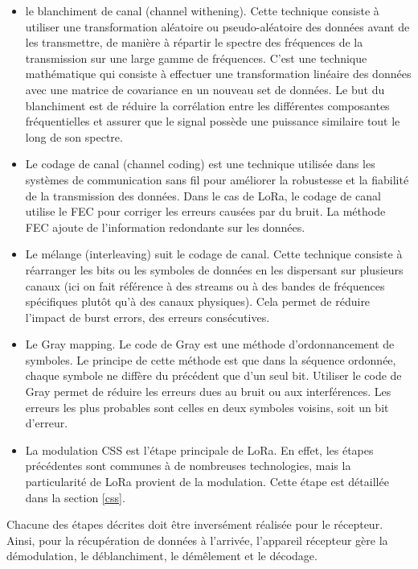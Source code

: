 \begin{itemize}
\item le blanchiment de canal (channel withening).
Cette technique consiste à utiliser une transformation aléatoire ou pseudo-aléatoire des données avant de les transmettre, de manière à répartir le spectre des fréquences de la transmission sur une large gamme de fréquences. C'est une technique mathématique qui consiste à effectuer une transformation linéaire des données avec une matrice de covariance en un nouveau set de données. Le but du blanchiment est de réduire la corrélation entre les différentes composantes fréquentielles et assurer que le signal possède une puissance similaire tout le long de son spectre.
\item Le codage de canal (channel coding) est une technique utilisée dans les systèmes de communication sans fil pour améliorer la robustesse et la fiabilité de la transmission des données. Dans le cas de LoRa, le codage de canal utilise le \ac{FEC} pour corriger les erreurs causées par du bruit. La méthode FEC ajoute de l'information redondante sur les données.
\item Le mélange (interleaving) suit le codage de canal.  
Cette technique consiste à réarranger les bits ou les symboles de données en les dispersant sur plusieurs canaux (ici on fait référence à des streams ou à des bandes de fréquences spécifiques plutôt qu'à des canaux physiques). Cela permet de réduire l'impact de burst errors, des erreurs consécutives.
\item Le Gray mapping. Le code de Gray est une méthode d'ordonnancement de symboles. Le principe de cette méthode est que dans la séquence ordonnée, chaque symbole ne diffère du précédent que d'un seul bit. Utiliser le code de Gray permet de réduire les erreurs dues au bruit ou aux interférences. Les erreurs les plus probables sont celles en deux symboles voisins, soit un bit d'erreur.
\item La modulation \ac{CSS} est l'étape principale de LoRa. En effet, les étapes précédentes sont communes à de nombreuses technologies, mais la particularité de LoRa provient de la modulation. Cette étape est détaillée dans la section \ref{css}.
\end{itemize}

\vspace{0.1cm}

Chacune des étapes décrites doit être inversément réalisée pour le récepteur. Ainsi, pour la récupération de données à l'arrivée, l'appareil récepteur gère la démo\-dulation, le déblanchiment, le démêlement et le décodage.

